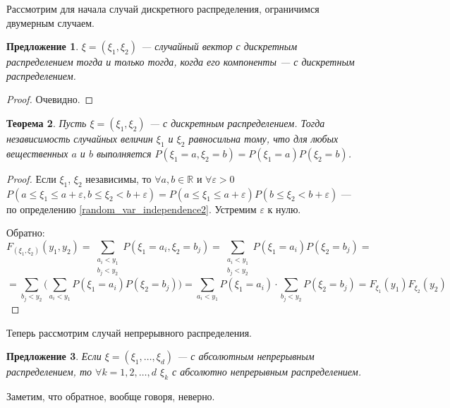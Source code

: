 \documentclass[11pt,openany,a4paper]{scrartcl}
\theoremstyle{plain}
\newtheorem{theorem}{Теорема}[subsection]
\newtheorem{proposition}[theorem]{Предложение}
\theoremstyle{definition}
\newcommand\mb{\mathbb}
\newcommand\real{\mb R}
\begin{document}
Рассмотрим для начала случай дискретного распределения, ограничимся двумерным 
случаем.

\begin{proposition}
    $\xi = (\xi_1, \xi_2)$ — случайный вектор с дискретным распределением
    тогда и только тогда, когда его компоненты — с дискретным распределением.
\end{proposition}
\begin{proof}
    Очевидно.
\end{proof}

\begin{theorem}
    Пусть $\xi = (\xi_1, \xi_2)$ — с дискретным распределением.
    Тогда независимость
    случайных величин $\xi_1$ и $\xi_2$ равносильна тому, что для любых 
    вещественных $a$ и $b$ выполняется $P(\xi_1 = a, \xi_2 = b) =
    P(\xi_1 = a)P(\xi_2 = b)$.
\end{theorem}
\begin{proof}
        Если $\xi_1$, $\xi_2$ независимы, то
        $\forall a,b \in \real$ и $\forall \varepsilon > 0$
        $P(a \leqslant \xi_1 \leqslant a + \varepsilon,
        b \leqslant \xi_2 < b + \varepsilon) =
        P(a \leqslant \xi_1 \leqslant a + \varepsilon)
        P(b \leqslant \xi_2 < b + \varepsilon)$ — по определению 
        \ref{random_var_independence2}. Устремим $\varepsilon$ к нулю.
        
        Обратно:
        $$
        F_{(\xi_1, \xi_2)}(y_1, y_2) =
        \sum\limits_{\substack{a_i < y_1\\b_j < y_2}} P(\xi_1 = a_i, \xi_2 = b_j) =
        \sum\limits_{\substack{a_i < y_1\\b_j < y_2}} P(\xi_1 = a_i)P(\xi_2 = b_j) =
        $$
        $$
        = \sum\limits_{b_j < y_2}\Bigg(\sum\limits_{a_i < y_1}
        P(\xi_1 = a_i)P(\xi_2 = b_j)\Bigg) =
        \sum\limits_{a_i < y_1} P(\xi_1 = a_i) \cdot
        \sum\limits_{b_j < y_2} P(\xi_2 = b_j) =
        F_{\xi_1}(y_1) F_{\xi_2}(y_2)
        $$
\end{proof}

Теперь рассмотрим случай непрерывного распределения.

\begin{proposition}
    Если $\xi = (\xi_1, \ldots, \xi_d)$ — с абсолютным непрерывным распределением,
    то $\forall k = 1, 2,\ldots, d$ $\xi_k$ с абсолютно непрерывным 
    распределением.
\end{proposition}

Заметим, что обратное, вообще говоря, неверно.
\end{document}
